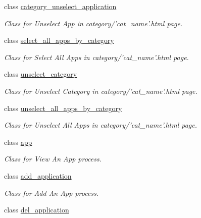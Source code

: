 \begin{CompactItemize}
class \hyperlink{classweb__winsol_1_1category__unselect__application}{category\_\-unselect\_\-application}
\begin{CompactList}\small\item\em Class for {\em Unselect\/} {\em App\/} in {\em category/'cat\_\-name'\/}.html page. \item\end{CompactList}\item 
class \hyperlink{classweb__winsol_1_1select__all__apps__by__category}{select\_\-all\_\-apps\_\-by\_\-category}
\begin{CompactList}\small\item\em Class for {\em Select\/} {\em All\/} {\em Apps\/} in {\em category/'cat\_\-name'\/}.html page. \item\end{CompactList}\item 
class \hyperlink{classweb__winsol_1_1unselect__category}{unselect\_\-category}
\begin{CompactList}\small\item\em Class for {\em Unselect\/} {\em Category\/} in {\em category/'cat\_\-name'\/}.html page. \item\end{CompactList}\item 
class \hyperlink{classweb__winsol_1_1unselect__all__apps__by__category}{unselect\_\-all\_\-apps\_\-by\_\-category}
\begin{CompactList}\small\item\em Class for {\em Unselect\/} {\em All\/} {\em Apps\/} in {\em category/'cat\_\-name'\/}.html page. \item\end{CompactList}\item 
class \hyperlink{classweb__winsol_1_1app}{app}
\begin{CompactList}\small\item\em Class for {\em View\/} {\em An\/} {\em App\/} process. \item\end{CompactList}\item 
class \hyperlink{classweb__winsol_1_1add__application}{add\_\-application}
\begin{CompactList}\small\item\em Class for {\em Add\/} {\em An\/} {\em App\/} process. \item\end{CompactList}\item 
class \hyperlink{classweb__winsol_1_1del__application}{del\_\-application}

\end{CompactItemize}
